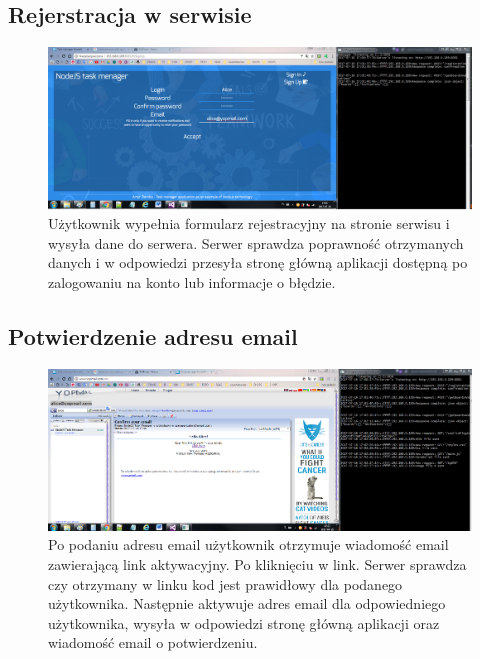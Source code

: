 \documentclass[12pt]{report}
\begin{document}
\newpage 
\subsection{Rejerstracja w serwisie}
\begin{figure}[!hb]
\centering
\includegraphics[width=\textwidth,height=\textheight,keepaspectratio]{22.png}
\captionsetup{labelformat=empty}
\caption[]{Użytkownik wypełnia formularz rejestracyjny na stronie serwisu i wysyła dane do serwera. 
Serwer sprawdza poprawność otrzymanych danych i w odpowiedzi przesyła stronę główną aplikacji dostępną po zalogowaniu na konto lub informacje o błędzie.}
\end{figure}

\subsection{Potwierdzenie adresu email}
\begin{figure}[!hb]
\centering
\includegraphics[width=\textwidth,height=\textheight,keepaspectratio]{32.png}
\captionsetup{labelformat=empty}
\caption[]{Po podaniu adresu email użytkownik otrzymuje wiadomość email zawierającą link aktywacyjny. 
Po kliknięciu w link. Serwer sprawdza czy otrzymany w linku kod jest prawidłowy dla podanego użytkownika. 
Następnie aktywuje adres email dla odpowiedniego użytkownika, wysyła w odpowiedzi stronę główną aplikacji oraz wiadomość email o potwierdzeniu.}
\end{figure}

\newpage 
\end{document}
